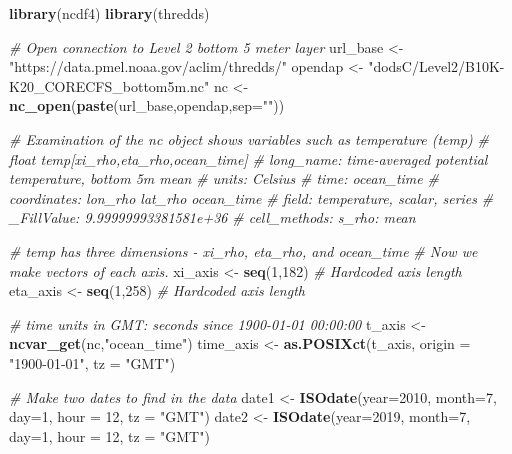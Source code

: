 \documentclass[
]{article}
\newenvironment{Shaded}{\begin{snugshade}}{\end{snugshade}}
\newcommand{\CommentTok}[1]{\textcolor[rgb]{0.56,0.35,0.01}{\textit{#1}}}
\newcommand{\DataTypeTok}[1]{\textcolor[rgb]{0.13,0.29,0.53}{#1}}
\newcommand{\DecValTok}[1]{\textcolor[rgb]{0.00,0.00,0.81}{#1}}
\newcommand{\KeywordTok}[1]{\textcolor[rgb]{0.13,0.29,0.53}{\textbf{#1}}}
\newcommand{\NormalTok}[1]{#1}
\newcommand{\StringTok}[1]{\textcolor[rgb]{0.31,0.60,0.02}{#1}}
\begin{document}
\begin{Shaded}
\begin{Highlighting}[]
   \KeywordTok{library}\NormalTok{(ncdf4)}
   \KeywordTok{library}\NormalTok{(thredds)  }

   \CommentTok{# Open connection to Level 2 bottom 5 meter layer}
\NormalTok{   url_base <-}\StringTok{ "https://data.pmel.noaa.gov/aclim/thredds/"}
\NormalTok{   opendap  <-}\StringTok{ "dodsC/Level2/B10K-K20_CORECFS_bottom5m.nc"}
\NormalTok{   nc       <-}\StringTok{ }\KeywordTok{nc_open}\NormalTok{(}\KeywordTok{paste}\NormalTok{(url_base,opendap,}\DataTypeTok{sep=}\StringTok{""}\NormalTok{))}

   \CommentTok{# Examination of the nc object shows variables such as temperature (temp)}
   \CommentTok{#        float temp[xi_rho,eta_rho,ocean_time]   }
   \CommentTok{#            long_name: time-averaged potential temperature, bottom 5m mean}
   \CommentTok{#            units: Celsius}
   \CommentTok{#            time: ocean_time}
   \CommentTok{#            coordinates: lon_rho lat_rho ocean_time}
   \CommentTok{#            field: temperature, scalar, series}
   \CommentTok{#            _FillValue: 9.99999993381581e+36}
   \CommentTok{#            cell_methods: s_rho: mean}

   \CommentTok{# temp has three dimensions - xi_rho, eta_rho, and ocean_time}
   \CommentTok{# Now we make vectors of each axis.}
\NormalTok{   xi_axis  <-}\StringTok{ }\KeywordTok{seq}\NormalTok{(}\DecValTok{1}\NormalTok{,}\DecValTok{182}\NormalTok{) }\CommentTok{# Hardcoded axis length}
\NormalTok{   eta_axis <-}\StringTok{ }\KeywordTok{seq}\NormalTok{(}\DecValTok{1}\NormalTok{,}\DecValTok{258}\NormalTok{) }\CommentTok{# Hardcoded axis length}

   \CommentTok{# time units in GMT: seconds since 1900-01-01 00:00:00}
\NormalTok{   t_axis   <-}\StringTok{ }\KeywordTok{ncvar_get}\NormalTok{(nc,}\StringTok{"ocean_time"}\NormalTok{)}
\NormalTok{   time_axis <-}\StringTok{ }\KeywordTok{as.POSIXct}\NormalTok{(t_axis, }\DataTypeTok{origin =} \StringTok{"1900-01-01"}\NormalTok{, }\DataTypeTok{tz =} \StringTok{"GMT"}\NormalTok{)}

   \CommentTok{# Make two dates to find in the data}
\NormalTok{   date1 <-}\StringTok{ }\KeywordTok{ISOdate}\NormalTok{(}\DataTypeTok{year=}\DecValTok{2010}\NormalTok{, }\DataTypeTok{month=}\DecValTok{7}\NormalTok{, }\DataTypeTok{day=}\DecValTok{1}\NormalTok{, }\DataTypeTok{hour =} \DecValTok{12}\NormalTok{, }\DataTypeTok{tz =} \StringTok{"GMT"}\NormalTok{)}
\NormalTok{   date2 <-}\StringTok{ }\KeywordTok{ISOdate}\NormalTok{(}\DataTypeTok{year=}\DecValTok{2019}\NormalTok{, }\DataTypeTok{month=}\DecValTok{7}\NormalTok{, }\DataTypeTok{day=}\DecValTok{1}\NormalTok{, }\DataTypeTok{hour =} \DecValTok{12}\NormalTok{, }\DataTypeTok{tz =} \StringTok{"GMT"}\NormalTok{)}


\end{Highlighting}
\end{Shaded}
\end{document}
